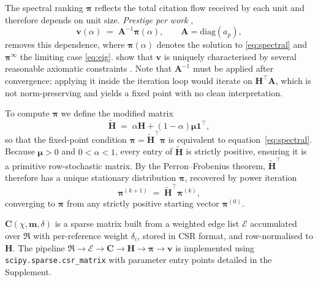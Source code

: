 The spectral ranking $\boldsymbol{\pi}$ reflects the total citation flow
received by each unit and therefore depends on unit size.
\emph{Prestige per work} \citep{palacios-huertaMeasurementIntellectualInfluence2004},
\begin{equation}
    \mathbf{v}(\alpha)
    \;=\;
    \mathbf{A}^{-1}\boldsymbol{\pi}(\alpha),
    \qquad
    \mathbf{A}=\mathrm{diag}(a_p),
    \label{eq:vstar}
\end{equation}
removes this dependence, where $\boldsymbol{\pi}(\alpha)$ denotes the
solution to \eqref{eq:spectral} and $\boldsymbol{\pi}^{\infty}$ the
limiting case \eqref{eq:eig}.
\cite{palacios-huertaMeasurementIntellectualInfluence2004} show that
$\mathbf{v}$ is uniquely characterised by several reasonable axiomatic
constraints \citep[but see][]{serranoMeasurementIntellectualInfluence2004}.
Note that $\mathbf{A}^{-1}$ must be applied after convergence; applying
it inside the iteration loop would iterate on $\mathbf{H}^\top\mathbf{A}$,
which is not norm-preserving and yields a fixed point with no clean
interpretation.

To compute $\boldsymbol{\pi}$ we define the modified matrix
\begin{equation}
	\mathbf{\tilde{H}}
	\;=\;
	\alpha\mathbf{H}+(1-\alpha)\boldsymbol{\mu}\mathbf{1}^\top,
	\label{eq:Hstar}
\end{equation}
so that the fixed-point condition
$\boldsymbol{\pi}=\mathbf{\tilde{H}}^{\top}\boldsymbol{\pi}$
is equivalent to equation~\eqref{eq:spectral}.
Because $\boldsymbol{\mu}>0$ and $0<\alpha<1$, every entry of $\mathbf{\tilde{H}}$
is strictly positive, ensuring it is a primitive row-stochastic matrix.
By the Perron--Frobenius theorem, $\mathbf{\tilde{H}}^{\top}$ therefore
has a unique stationary distribution $\boldsymbol{\pi}$, recovered by
power iteration
\begin{equation}
	\boldsymbol{\pi}^{(k+1)}
	\;=\;
	\mathbf{\tilde{H}}^{\top}\boldsymbol{\pi}^{(k)},
	\label{eq:power}
\end{equation}
converging to $\boldsymbol{\pi}$ from any strictly positive starting
vector $\boldsymbol{\pi}^{(0)}$.

$\mathbf{C}(\chi,\mathbf{m},\delta)$ is a sparse matrix built from a
weighted edge list $\mathcal{E}$ accumulated over $\mathfrak{R}$ with
per-reference weight $\delta_i$, stored in CSR format, and
row-normalised to $\mathbf{H}$. The pipeline
$\mathfrak{R}\!\to\!\mathcal{E}\!\to\!\mathbf{C}\!\to\!\mathbf{H}
\!\to\!\boldsymbol{\pi}\!\to\!\mathbf{v}$
is implemented using \texttt{scipy.sparse.csr\_matrix} with parameter
entry points detailed in the Supplement.
